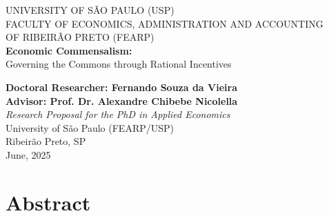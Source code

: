 \documentclass[a4paper,12pt,oneside,brazil,english,nottoc,notbib]{abntex2}
\newcommand{\listabstractname}{Abstract}
\newcommand{\addabstracttoc}{%
  \addcontentsline{toc}{section}{\protect\numberline{}\listabstractname}%
}
\renewcommand{\thesection}{\arabic{section}.}
\begin{document}
\begin{titlingpage}
    \centering
    {\large UNIVERSITY OF S\~AO PAULO (USP)\\[0.2cm]
    FACULTY OF ECONOMICS, ADMINISTRATION AND ACCOUNTING\\
    OF RIBEIR\~AO PRETO (FEARP)}\\[3.5cm]

    {\Huge \bfseries Economic Commensalism:}\\[0.3cm]
    {\LARGE Governing the Commons through Rational Incentives}

    \vspace{1.5cm}

    {\large \textbf{Doctoral Researcher: Fernando Souza da Vieira}}\\[0.3cm]
    {\large \textbf{Advisor: Prof. Dr. Alexandre Chibebe Nicolella}}\\[2cm]

    \textit{Research Proposal for the PhD in Applied Economics}\\
    University of S\~ao Paulo (FEARP/USP)\\[2.5cm]

\vfill
{\large Ribeir\~ao Preto, SP}\\[0.3cm]
{\large June, 2025}

\end{titlingpage}

\clearpage
\begingroup
{}
\renewcommand{\addcontentsline}[3]{}
\tableofcontents
\endgroup
\clearpage

\setcounter{page}{5}
\pagestyle{fancy}

\clearpage
\addabstracttoc
\section*{Abstract}


\clearpage
\thispagestyle{fancy}

\clearpage
\thispagestyle{fancy}

\clearpage
\thispagestyle{fancy}

\clearpage
\thispagestyle{fancy}


\clearpage
\appendix
\renewcommand{\thesection}{\Alph{section}.}
\thispagestyle{fancy}

\clearpage
\thispagestyle{fancy}


\clearpage


\end{document}
